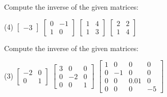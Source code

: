 \begin{exercise}
Compute the inverse of the given matrices:
\begin{tasks}(4)
\task
$\begin{bmatrix}
-3
\end{bmatrix}$
\task
$\begin{bmatrix}
0 & -1 \\
1 & 0
\end{bmatrix}$
\task
$\begin{bmatrix}
1 & 4 \\
1 & 3
\end{bmatrix}$
\task
$\begin{bmatrix}
2 & 2 \\
1 & 4
\end{bmatrix}$
\end{tasks}
\end{exercise}

\begin{exercise}
Compute the inverse of the given matrices:
\begin{tasks}(3)
\task
$\begin{bmatrix}
-2 & 0 \\
0 & 1
\end{bmatrix}$
\task
$\begin{bmatrix}
3 & 0 & 0 \\
0 & -2 & 0 \\
0 & 0 & 1
\end{bmatrix}$
\task
$\begin{bmatrix}
1 & 0 & 0 & 0 \\
0 & -1 & 0 & 0 \\
0 & 0 & 0.01 & 0 \\
0 & 0 & 0 & -5
\end{bmatrix}$
\end{tasks}
\end{exercise}

\setcounter{exercise}{100}

